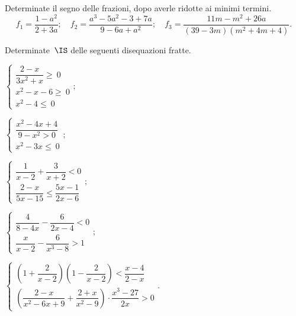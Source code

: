 \begin{esercizio}
\label{ese:21.66}
Determinate il segno delle frazioni, dopo averle ridotte ai minimi termini.
\[f_{1}=\dfrac{1-a^{2}}{2+3a};\quad f_{2}=\dfrac{a^{3}-5a^{2}-3+7a}{9-6a+a^{2}};\quad f_{3}=\dfrac{11m-m^{2}+26a}{(39-3m)(m^{2}+4m+4)}.\]
\end{esercizio}

\begin{esercizio}[\Ast]
\label{ese:21.67}
Determinate~$\IS$ delle seguenti disequazioni fratte.
\begin{multicols}{2}
\begin{enumeratea}{\longarray
 \item $\left\{\begin{array}{l}
  \dfrac{2-x}{3x^{2}+x}\ge~0\\
  x^{2}-x-6\ge~0\\
  x^{2}-4\le~0
        \end{array}\right.;$
\item $\left\{\begin{array}{l}
        \dfrac{x^{2}-4x+4}{9-x^{2}>0}\\
        x^{2}-3x\le~0
       \end{array}\right.;$
\item $\left\{\begin{array}{l}
           \dfrac{1}{x-2}+\dfrac{3}{x+2}<0\\
           \dfrac{2-x}{5x-15}\le\dfrac{5x-1}{2x-6}
           \end{array}\right.;$
\item $\left\{\begin{array}{l}
           \dfrac{4}{8-4x}-\dfrac{6}{2x-4}<0\\
           \dfrac{x}{x-2}-\dfrac{6}{x^{3}-8}>1
           \end{array}\right.;$
\item $\left\{\begin{array}{l}
           \left(1+\dfrac{2}{x-2}\right)\left(1-\dfrac{2}{x-2}\right)<\dfrac{x-4}{2-x}\\
           \left(\dfrac{2-x}{x^{2}-6x+9}+\dfrac{2+x}{x^{2}-9}\right)\cdot{\dfrac{x^{3}-27}{2x}}>0
           \end{array}\right..$}
\end{enumeratea}
\end{multicols}
\end{esercizio}

